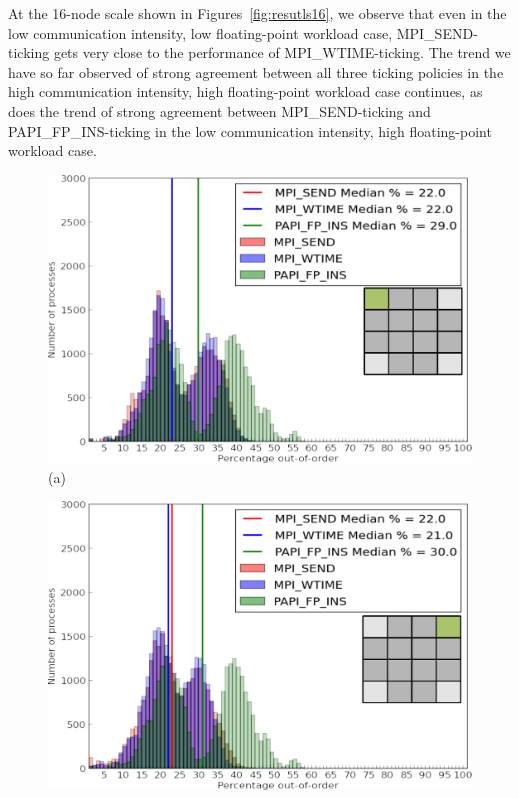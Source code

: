 At the 16-node scale shown in Figures~\ref{fig:resutls16}, we observe
that even in the low communication intensity, low floating-point
workload case, MPI\_SEND-ticking gets very close to the performance of
MPI\_WTIME-ticking. The trend we have so far observed of strong
agreement between all three ticking policies in the high communication
intensity, high floating-point workload case continues, as does the
trend of strong agreement between MPI\_SEND-ticking and
PAPI\_FP\_INS-ticking in the low communication intensity, high
floating-point workload case.
\begin{figure}[!htb]
    \begin{minipage}[b]{0.5\linewidth}
        \centering
        \includegraphics[width=0.95\linewidth]{chapter_3_figures/hist_nodes16_procs256_particles1000_cycles10_bufferSize5.pdf}
        \\ (a) \\
    \end{minipage}
    \begin{minipage}[b]{0.5\linewidth}
        \centering
        \includegraphics[width=0.95\linewidth]{chapter_3_figures/hist_nodes16_procs256_particles1000_cycles10_bufferSize5000.pdf}

\end{minipage}
\end{figure}
